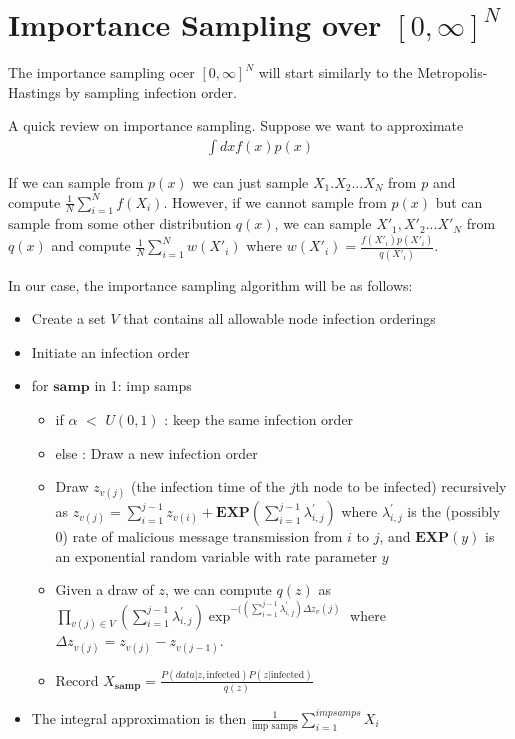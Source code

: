 \documentclass{article}
\begin{document}
\section{Importance Sampling over $[0, \infty]^N$}

The importance sampling ocer $[0, \infty]^N$ will start similarly to the Metropolis-Hastings by sampling infection order.

A quick review on importance sampling.  Suppose we want to approximate
\begin{align}
\int dx f(x)p(x)
\end{align}

If we can sample from $p(x)$ we can just sample $X_1. X_2 ...X_N$ from $p$ and compute $\frac{1}{N}\sum_{i=1}^Nf(X_i)$.
However, if we cannot sample from $p(x)$ but can sample from some other distribution $q(x)$, we can sample $X'_1, X'_2 ...X'_N$ from 
$q(x)$ and compute $\frac{1}{N}\sum_{i=1}^Nw(X'_i)$ where $w(X'_i) = \frac{f(X'_i)p(X'_i)}{q(X'_i)}$.  

In our case, the importance sampling algorithm will be as follows:


\begin{itemize}
\item Create a set $V$ that contains all allowable node infection orderings
\item Initiate an infection order
\item for $\mathbf{samp}$ in 1: imp samps
\begin{itemize}
\item if $\alpha$ $<$ $U(0,1)$ : keep the same infection order
\item else : Draw a new infection order
\item Draw $z_{v(j)}$ (the infection time of the $j$th node to be infected) recursively
as $z_{v(j)} = \sum_{i=1}^{j-1}z_{v(i)} + \mathbf{EXP}(\sum_{i=1}^{j-1}\lambda^{'}_{i,j})$ 
where $\lambda^{'}_{i,j}$ is the (possibly 0) rate of malicious message transmission from $i$ to $j$,  and $\mathbf{EXP}(y)$ is 
an exponential random variable with rate parameter $y$
\item Given a draw of $z$, we can compute $q(z)$ as $\prod_{v(j)\in V}(\sum_{i=1}^{j-1}\lambda^{'}_{i,j})\exp^{-((\sum_{i=1}^{j-1}\lambda^{'}_{i,j})\Delta z_v(j)}$
where $\Delta z_{v(j)} = z_{v(j)} - z_{v(j-1)}$.
\item Record $X_{\mathbf{samp}} = \frac{P(data |z, \text{infected})P(z|\text{infected})}{q(z)}$
\end{itemize}
\item The integral approximation is then $\frac{1}{\text{imp samps}}\sum_{i=1}^{imp samps}X_i$
\end{itemize}
\end{document}
